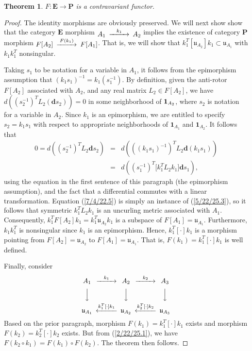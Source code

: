 \documentclass{amsart}
\newtheorem{theorem}{Theorem}
\theoremstyle{definition}
\numberwithin{theorem}{section}
\numberwithin{equation}{section}
\begin{document}
\begin{theorem}\label{6/13/22.1}  $F: \mathbf{E}\rightarrow \mathbf{P}$ is a contravariant functor. 
 \end{theorem}
 \begin{proof}  The identity morphisms are obviously preserved.
We will next show show that the category $\mathbf{E}$ morphism $ \begin{CD}  A_1 @>k_1>> A_2\end{CD}$ implies the existence of category {\bf P} morphism $ \begin{CD}  F[A_2] @>F(k_1)>> F[A_1]\end{CD}$.  That is, we will show that $k_1^T[\mathfrak{u}_{A_2}]k_1 \subset \mathfrak{u}_{A_1}$ with $k_1k_1^T$ nonsingular.

 Taking $s_1$ to be notation for a variable in $A_1$, it follows from the epimorphism assumption that $(k_1s_1)^{-1} = k_1(s_1^{-1})$.  By definition, given the anti-rotor $F[A_2]$ associated with $A_2$, and any real matrix  $L_2 \in F[A_2]$, we have $d\left((s_2^{-1})^TL_2 (\mathbf{d}s_2)\right) = 0$ in some neighborhood of ${\bf 1}_{A_2}$, where $s_2$ is notation for a variable in $A_2$.  Since $k_1$ is an epimorphism, we are entitled to specify $s_2=k_1 s_1$ with respect to appropriate neighborhoods of $\mathbf{1}_{A_1}$ and $\mathbf{1}_{A_2}$.   It follows that \begin{eqnarray}\nonumber 0 = d\left((s_2^{-1})^TL_2 \mathbf{d}s_2\right) &=&  d\left(((k_1s_1)^{-1})^TL_2 \mathbf{d}(k_1s_1)\right) \\  &=& d\left((s_1^{-1})^T \big[k_1^T L_2k_1\big]\mathbf{d}s_1\right), \label{7/4/22.5}  \end{eqnarray}   using the equation in the first sentence of this paragraph (the epimorphism assumption), and the fact that a differential commutes with a linear transformation.  Equation (\ref{7/4/22.5}) is simply an instance of (\ref{5/22/25.3}), so it follows that symmetric $k_1^T L_2k_1$ is an uncurling metric associated with $A_1$.  
 Consequently, $k_1^TF[A_2]k_1 = k_1^T\mathfrak{u}_{A_2}k_1$ is a subspace of $F[A_1] = \mathfrak{u}_{A_1}$.  Furthermore, $k_1k_1^T$ is nonsingular since $k_1$ is an epimorphism.  Hence, $k_1^T[\cdot]k_1$ is a morphism pointing from $F[A_2]= \mathfrak{u}_{A_2}$ to $F[A_1]=\mathfrak{u}_{A_1}$.  That is, $F(k_1)=k_1^T[\cdot]k_1$ is well defined.

Finally, consider
      \[  \begin{CD}  
A_1 @>k_1>> A_2 @>k_2>> A_3\\
 @VVV   @VVV  @VVV\\
\mathfrak{u}_{A_1}   @<k_1^T[\cdot]k_1<<  \mathfrak{u}_{A_2}  @<k_2^T[\cdot]k_2<<  \mathfrak{u}_{A_3} \\ 
 \end{CD} \]
Based on the prior paragraph, morphism $F(k_1) = k_1^T[\cdot]k_1$ exists and morphism $F(k_2) = k_2^T[\cdot]k_2$ exists.  But from (\ref{2/22/25.1}), we have $ F(k_2\circ k_1) = F(k_1)\circ F(k_2)$.   The theorem then follows.
\end{proof}
\end{document}

